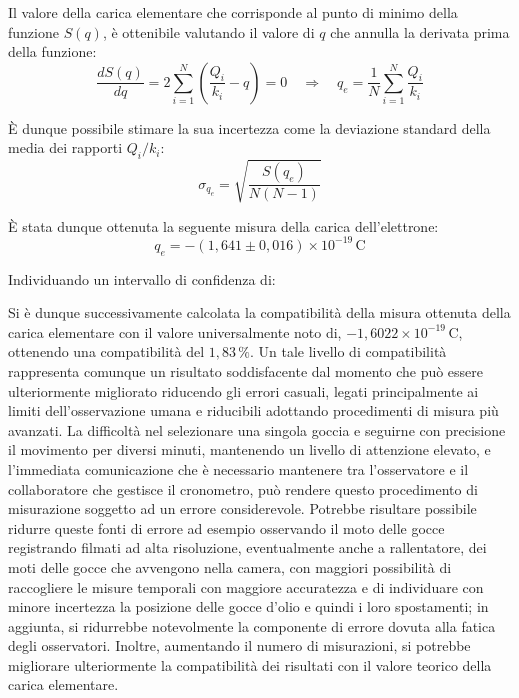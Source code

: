 \documentclass[a4paper,12pt]{article}
\begin{document}
Il valore della carica elementare che corrisponde al punto di minimo della funzione \( S(q) \), è ottenibile valutando il valore di \( q \) che annulla la derivata prima della funzione:
\begin{equation}
\frac{dS(q)}{dq} = 2 \sum_{i=1}^{N} \left( \frac{Q_i}{k_i} - q \right) = 0 \quad \Rightarrow \quad q_e = \frac{1}{N}\sum_{i=1}^{N}{ \frac {Q_i} {k_i}}
\label{eq:minimizzazione_Sq}
\end{equation}

È dunque possibile stimare la sua incertezza come la deviazione standard della media dei rapporti \(Q_i/k_i\):
\begin{equation}
\sigma_{q_e} = \sqrt{\frac{S(q_e)}{N(N-1)}}
\label{eq:incertezza_qe}
\end{equation}

È stata dunque ottenuta la seguente misura della carica dell’elettrone:
\begin{equation}
q_e = - (1,641 \pm 0,016) \times 10^{-19} \, \text{C}
\label{eq:carica_elementare}
\end{equation}

Individuando un intervallo di confidenza di:
\begin{equation}
[-1,625 \times 10^{-19} \, \text{C}, \, -1,657 \times 10^{-19} \, \text{C}]
\end{equation}

Si è dunque successivamente calcolata la compatibilità della misura ottenuta della carica elementare con il valore universalmente noto di, 
\( -1,6022 \times 10^{-19} \, \text{C} \), ottenendo una compatibilità del 
\( 1,83 \, \% \). 
Un tale livello di compatibilità rappresenta comunque un risultato soddisfacente dal momento che può essere ulteriormente migliorato riducendo gli errori casuali, legati principalmente ai limiti dell’osservazione umana e riducibili adottando procedimenti di misura più avanzati. La difficoltà nel selezionare una singola goccia e seguirne con precisione il movimento per diversi minuti, mantenendo un livello di attenzione elevato, e l’immediata comunicazione che è necessario mantenere tra l’osservatore e il collaboratore che gestisce il cronometro, può rendere questo procedimento di misurazione soggetto ad un errore considerevole. Potrebbe risultare possibile ridurre queste fonti di errore ad esempio osservando il moto delle gocce registrando filmati ad alta risoluzione, eventualmente anche a rallentatore, dei moti delle gocce che avvengono nella camera, con maggiori possibilità di raccogliere le misure temporali con maggiore accuratezza e di individuare con minore incertezza la posizione delle gocce d’olio e quindi i loro spostamenti; in aggiunta, si ridurrebbe notevolmente la componente di errore dovuta alla fatica degli osservatori. Inoltre, aumentando il numero di misurazioni, si potrebbe migliorare ulteriormente la compatibilità dei risultati con il valore teorico della carica elementare.
\end{document}
